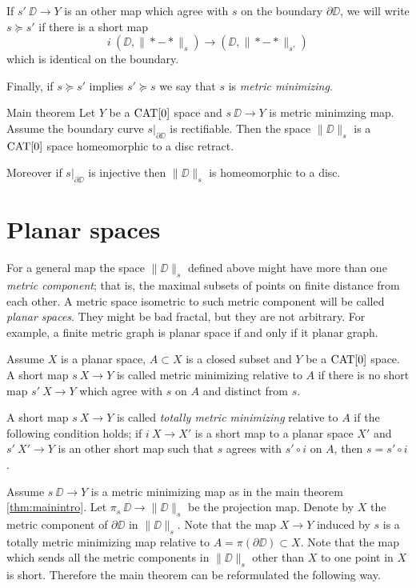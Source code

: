 \documentclass{article}
\begin{document}
If $s'\:\DD\to Y$ is an other map which agree with $s$ on the boundary $\partial \DD$,
we will write $s\succcurlyeq s'$ if there is a short map 
\[i\:(\DD,\|{*}-{*}\|_s)\to (\DD,\|{*}-{*}\|_{s'})\] 
which is identical on the boundary. 

Finally, if $s\succcurlyeq s'$ implies $s'\succcurlyeq s$ we say that $s$ is \emph{metric minimizing}.

\begin{thm}{Main theorem}\label{thm:mainintro}
Let $Y$ be a $\mathop{\rm CAT}\nolimits[0]$ space and $s\:\DD\to Y$ is metric minimzing map.
Assume the boundary curve $s|_{\partial\DD}$ is rectifiable.
Then the space $\|\DD\|_s$ is a $\mathop{\rm CAT}\nolimits[0]$ space homeomorphic to a disc retract.

Moreover if $s|_{\partial\DD}$ is injective then $\|\DD\|_s$ is homeomorphic to a disc.
\end{thm}

\section{Planar spaces}

For a general map the space $\|\DD\|_s$ defined above might have more than one \emph{metric component};
that is, the maximal subsets of points on finite distance from each other.
A metric space isometric to such metric component will be called \emph{planar spaces}.
They might be bad fractal, but they are not arbitrary.
For example, a finite metric graph is planar space if and only if it planar graph.

Assume $X$ is a planar space, 
$A\subset X$ is a closed subset
and $Y$ be a $\mathop{\rm CAT}\nolimits[0]$ space.
A short map $s\:X\to Y$ is called metric minimizing relative to $A$
if there is no short map $s'\:X\to Y$ which agree with $s$ on $A$ and distinct from $s$.

A short map $s\:X\to Y$ is called \emph{totally metric minimizing} relative to $A$
if the following condition holds;
if $i\:X\to X'$ is a short map to a planar space $X'$ and 
$s'\:X'\to Y$  is an other short map such that $s$ agrees with $s'\circ i$ on $A$,
then $s=s'\circ i$.

Assume $s\:\DD\to Y$ is a metric minimizing map as in the main theorem \ref{thm:mainintro}.
Let $\pi_s\:\DD\to \|\DD\|_s$ be the projection map.
Denote by $X$ the metric component of $\partial \DD$ in $\|\DD\|_s$.
Note that the map $X\to Y$ induced by $s$ is a totally metric minimizing map relative to $A=\pi(\partial \DD)\subset X$.
Note that the map  which sends all the metric components in $\|\DD\|_s$ other than $X$ to one point in $X$ is short.
Therefore the main theorem can be reformulated the following way.
\end{document}
